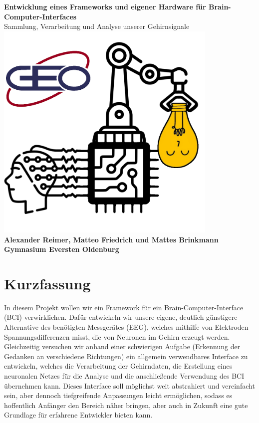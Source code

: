 \documentclass[10pt]{article}
\begin{document}
\thispagestyle{empty}

\vspace*{10mm}
\begin{center}
    {\Huge \textbf{\sansemph Entwicklung eines Frameworks und eigener Hardware für Brain-Computer-Interfaces}} \\[2mm]
    {\Large Sammlung, Verarbeitung und Analyse unserer Gehirnsignale} \\[4mm]
    \includegraphics[width=0.8\textwidth]{logo.png} \\[10mm]
    {\huge \textbf{Alexander Reimer, Matteo Friedrich und Mattes Brinkmann}} \\[1em]
    {\LARGE \textbf{Gymnasium Eversten Oldenburg}}
\end{center}

\newpage
{}

\tableofcontents

\section*{Kurzfassung}
In diesem Projekt wollen wir ein Framework für ein Brain-Computer-Interface (BCI) verwirklichen. Dafür entwickeln wir unsere eigene, deutlich günstigere Alternative des benötigten Messgerätes (EEG), welches mithilfe von Elektroden Spannungsdifferenzen misst, die von Neuronen im Gehirn erzeugt werden. Gleichzeitig versuchen wir anhand einer schwierigen Aufgabe (Erkennung der Gedanken an verschiedene Richtungen) ein allgemein verwendbares Interface zu entwickeln, welches die Verarbeitung der Gehirndaten, die Erstellung eines neuronalen Netzes für die Analyse und die anschließende Verwendung des BCI übernehmen kann. Dieses Interface soll möglichst weit abstrahiert und vereinfacht sein, aber dennoch tiefgreifende Anpassungen leicht ermöglichen, sodass es hoffentlich Anfänger den Bereich näher bringen, aber auch in Zukunft eine gute Grundlage für erfahrene Entwickler bieten kann.
\end{document}
